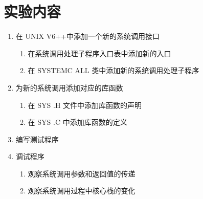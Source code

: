 \section{实验内容}
\begin{enumerate}
    \item 在 UNIX V6++中添加一个新的系统调用接口
    \begin{enumerate}
        \item 在系统调用处理子程序入口表中添加新的入口
        \item  在 SYSTEMC ALL 类中添加新的系统调用处理子程序
    \end{enumerate}
    \item 为新的系统调用添加对应的库函数
    \begin{enumerate}
        \item 在 SYS .H 文件中添加库函数的声明
        \item 在 SYS .C 中添加库函数的定义
    \end{enumerate}
    \item 编写测试程序
    \item 调试程序
    \begin{enumerate}
        \item 观察系统调用参数和返回值的传递
        \item 观察系统调用过程中核心栈的变化
    \end{enumerate}
\end{enumerate}